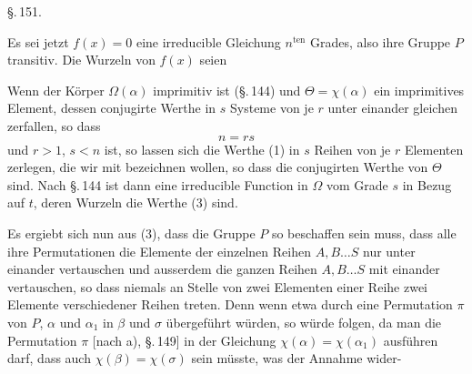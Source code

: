 \begin{center}
\S.\,151.

\end{center}

Es sei jetzt $f(x) = 0$ eine irreducible Gleichung $n^{\mathrm{ten}}$ Grades,
also ihre  Gruppe $P$ transitiv. Die Wurzeln von $f(x)$ seien

Wenn der Körper $\Omega(\alpha)$ imprimitiv ist (\S.\,144) und
$\Theta = \chi(\alpha)$ ein imprimitives Element, dessen conjugirte Werthe in
$s$ Systeme von je $r$ unter einander gleichen zerfallen, so dass
\[
n = rs
\]
und $r > 1$, $s < n$ ist, so lassen sich die Werthe (1) in $s$ Reihen von je
$r$ Elementen zerlegen, die wir mit
bezeichnen wollen, so dass
die conjugirten Werthe von $\Theta$ sind. Nach \S.\,144 ist dann
eine irreducible Function in $\Omega$ vom Grade $s$ in Bezug auf $t$, deren
Wurzeln die Werthe (3) sind.

Es ergiebt sich nun aus (3), dass die Gruppe $P$ so beschaffen sein muss,
dass alle ihre Permutationen die Elemente der einzelnen Reihen $A, B \ldots
S$ nur unter einander vertauschen und ausserdem die ganzen Reihen $A, B
\ldots S$ mit einander vertauschen, so dass niemals an Stelle von zwei
Elementen einer Reihe zwei Elemente verschiedener Reihen treten. Denn wenn
etwa durch eine Permutation $\pi$ von $P$, $\alpha$ und $\alpha_1$ in $\beta$
und $\sigma$ übergeführt würden, so würde folgen, da man die Permutation
$\pi$ [nach a), \S.\,149] in der Gleichung $\chi(\alpha) = \chi(\alpha_1)$
ausführen darf, dass auch $\chi(\beta) = \chi(\sigma)$ sein müsste, was der
Annahme wider-
